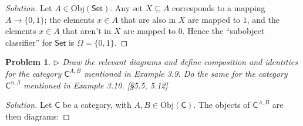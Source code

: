 \documentclass[fontsize=14pt]{scrartcl}
\newtheorem{problem-internal}{Problem}[subsection]
\newenvironment{problem}{
  \medskip
  \begin{problem-internal}
}{
  \end{problem-internal}
}
\newenvironment{solution}{
  \begin{proof}[Solution]
  \vspace{-8px}
  \setlength{\parskip}{4px}
  \setlength{\parindent}{0px}
}{
  \end{proof}
}
\newcommand{\Obj}{\mathrm{Obj}}
\begin{document}
\begin{solution}
\def \C {\mathsf{C}}
\def \Set {\mathsf{Set}}

Let $A\in\Obj(\Set)$. Any set $X\subseteq A$ corresponds to a mapping
$A\to\{0,1\}$; the elements $x\in A$ that are also in $X$ are mapped to $1$, and
the elements $x\in A$ that aren't in $X$ are mapped to $0$. Hence the
``subobject classifier'' for $\Set$ is $\Omega=\{0,1\}$.
\end{solution}


\begin{problem}
\def \C {\mathsf{C}}

$\rhd$ Draw the relevant diagrams and define composition and identities for the
category $\C^{A,B}$ mentioned in Example 3.9. Do the same for the category
$\C^{\alpha,\beta}$ mentioned in Example 3.10. [\S5.5, 5.12]
\end{problem}

\begin{solution}
\def \C {\mathsf{C}}

Let $\C$ be a category, with $A,B\in\Obj(\C)$. The objects of $\C^{A,B}$ are
then diagrams:
\end{solution}
\end{document}
